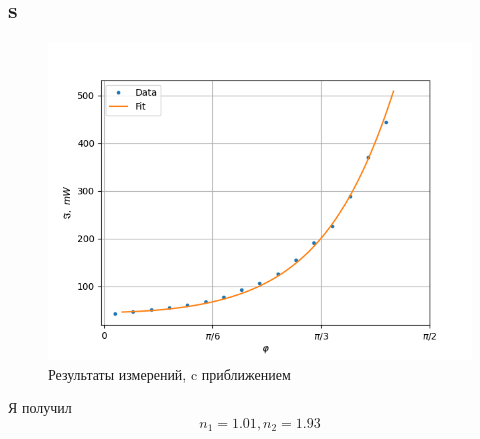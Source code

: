 \subsection{s}
\begin{figure}[h]
    \centering
    \includegraphics[trim={0 0 0 0},clip,width=\textwidth]{Ex_2/Task_2_2_1.png}
     \caption{Результаты измерений, c приближением}
    \label{Task_2_2_1}
\end{figure}

Я получил $$ n_1 = 1.01, n_2 = 1.93 $$





